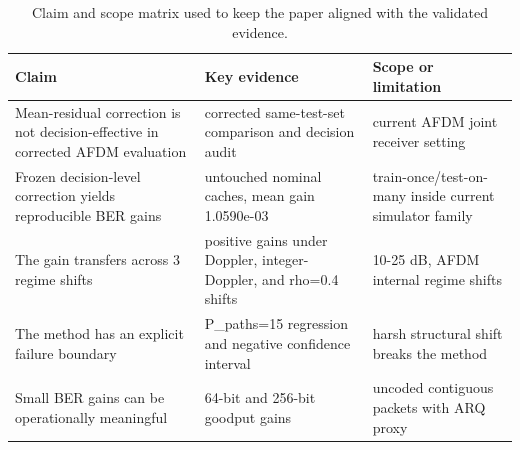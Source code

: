 \begin{table}[t]
\centering
\caption{Claim and scope matrix used to keep the paper aligned with the validated evidence.}
\label{tab:claim_scope}
\begin{tabular}{p{4.2cm}p{5.3cm}p{4.5cm}}
\toprule
Claim & Key evidence & Scope or limitation \\
\midrule
Mean-residual correction is not decision-effective in corrected AFDM evaluation & corrected same-test-set comparison and decision audit & current AFDM joint receiver setting \\
Frozen decision-level correction yields reproducible BER gains & untouched nominal caches, mean gain 1.0590e-03 & train-once/test-on-many inside current simulator family \\
The gain transfers across 3 regime shifts & positive gains under Doppler, integer-Doppler, and rho=0.4 shifts & 10-25 dB, AFDM internal regime shifts \\
The method has an explicit failure boundary & P\_paths=15 regression and negative confidence interval & harsh structural shift breaks the method \\
Small BER gains can be operationally meaningful & 64-bit and 256-bit goodput gains & uncoded contiguous packets with ARQ proxy \\
\bottomrule
\end{tabular}
\end{table}
